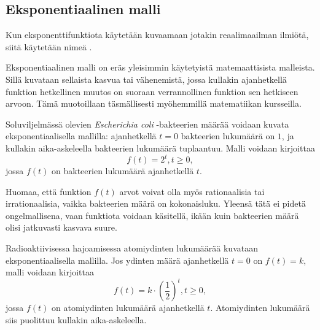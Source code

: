 \subsection*{Eksponentiaalinen malli}

Kun eksponenttifunktiota käytetään kuvaamaan jotakin reaalimaailman
ilmiötä, siitä käytetään nimeä .

Eksponentiaalinen malli on eräs yleisimmin käytetyistä matemaattisista
malleista. Sillä kuvataan sellaista kasvua tai vähenemistä, jossa
kullakin ajanhetkellä funktion hetkellinen muutos on suoraan
verrannollinen funktion sen hetkiseen arvoon. Tämä muotoillaan
täsmällisesti myöhemmillä matematiikan kursseilla.

\begin{esimerkki}
Soluviljelmässä olevien \textit{Escherichia coli} -bakteerien
määrää voidaan kuvata eksponentiaalisella mallilla: ajanhetkellä
$t = 0$ bakteerien lukumäärä on $1$, ja kullakin aika-askeleella
bakteerien lukumäärä tuplaantuu. Malli voidaan kirjoittaa
\[
f(t) = 2^t, t \ge 0,
\]
jossa $f(t)$ on bakteerien lukumäärä ajanhetkellä $t$.

Huomaa, että funktion $f(t)$ arvot voivat
olla myös rationaalisia tai irrationaalisia, vaikka bakteerien
määrä on kokonaisluku. Yleensä tätä ei pidetä ongelmallisena,
vaan funktiota voidaan käsitellä, ikään kuin bakteerien määrä
olisi jatkuvasti kasvava suure.

\begin{center}
	\begin{kuvaajapohja}{0.8}{-4}{6}{-1}{9}
	\end{kuvaajapohja}
\end{center}

\end{esimerkki}

\begin{esimerkki}
Radioaktiivisessa hajoamisessa atomiydinten lukumäärää kuvataan
eksponentiaalisella mallilla. Jos ydinten määrä ajanhetkellä
$t = 0$ on $f(t) = k$, malli voidaan kirjoittaa
\[
f(t) = k \cdot \left( \frac{1}{2} \right)^t, t \ge 0,
\]
jossa $f(t)$ on atomiydinten lukumäärä ajanhetkellä $t$. Atomiydinten
lukumäärä siis puolittuu kullakin aika-askeleella.
\end{esimerkki}


